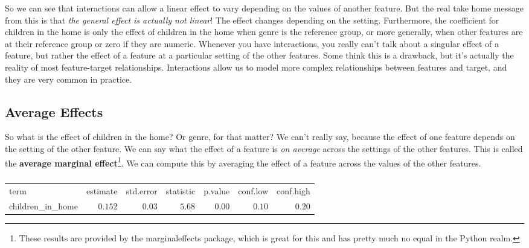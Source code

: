 \documentclass[
  letterpaper,
]{krantz}
\begin{document}
So we can see that interactions can allow a linear effect to vary
depending on the values of another feature. But the real take home
message from this is that \emph{the general effect is actually not
linear}! The effect changes depending on the setting. Furthermore, the
coefficient for children in the home is only the effect of children in
the home when genre is the reference group, or more generally, when
other features are at their reference group or zero if they are numeric.
Whenever you have interactions, you really can't talk about a singular
effect of a feature, but rather the effect of a feature at a particular
setting of the other features. Some think this is a drawback, but it's
actually the reality of most feature-target relationships. Interactions
allow us to model more complex relationships between features and
target, and they are very common in practice.

\subsection{Average Effects}\label{sec-lm-extend-avgeffect}

So what is the effect of children in the home? Or genre, for that
matter? We can't really say, because the effect of one feature depends
on the setting of the other feature. We can say what the effect of a
feature is \emph{on average} across the settings of the other features.
This is called the \textbf{average marginal effect}\footnote{These
  results are provided by the {marginaleffects} package, which is great
  for this and has pretty much no equal in the Python realm.}. We can
compute this by averaging the effect of a feature across the values of
the other features.

\begin{longtable}{lrrrrrr}

\caption{\label{tbl-model-interaction-avg-effect}Average Marginal
Effects of Children in the Home}

\tabularnewline

\caption*{
{\large }
} \\ 
\toprule
term & estimate & std.error & statistic & p.value & conf.low & conf.high \\ 
\midrule\addlinespace[2.5pt]
children\_in\_home & \textcolor[HTML]{404040}{$0.152$} & \textcolor[HTML]{404040}{$0.03$} & \textcolor[HTML]{404040}{$5.68$} & \textcolor[HTML]{404040}{$0.00$} & \textcolor[HTML]{404040}{$0.10$} & \textcolor[HTML]{404040}{$0.20$} \\ 
\bottomrule

\end{longtable}
\end{document}

